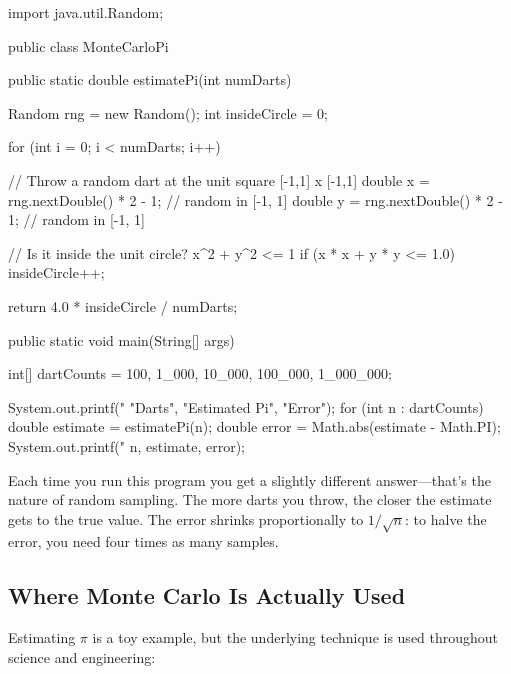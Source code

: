 \documentclass[11pt,letterpaper]{article}
\begin{document}
\begin{javacode}
import java.util.Random;

public class MonteCarloPi {

    public static double estimatePi(int numDarts) {
        Random rng = new Random();
        int insideCircle = 0;

        for (int i = 0; i < numDarts; i++) {
            // Throw a random dart at the unit square [-1,1] x [-1,1]
            double x = rng.nextDouble() * 2 - 1;   // random in [-1, 1]
            double y = rng.nextDouble() * 2 - 1;   // random in [-1, 1]

            // Is it inside the unit circle? x^2 + y^2 <= 1
            if (x * x + y * y <= 1.0) {
                insideCircle++;
            }
        }

        return 4.0 * insideCircle / numDarts;
    }

    public static void main(String[] args) {
        int[] dartCounts = {100, 1_000, 10_000, 100_000, 1_000_000};

        System.out.printf("%
                          "Darts", "Estimated Pi", "Error");
        for (int n : dartCounts) {
            double estimate = estimatePi(n);
            double error = Math.abs(estimate - Math.PI);
            System.out.printf("%
                              n, estimate, error);
        }
    }
}
\end{javacode}

Each time you run this program you get a slightly different answer---that's the nature of random sampling. The more darts you throw, the closer the estimate gets to the true value. The error shrinks proportionally to $1/\sqrt{n}$: to halve the error, you need four times as many samples.

\subsection{Where Monte Carlo Is Actually Used}

Estimating $\pi$ is a toy example, but the underlying technique is used throughout science and engineering:
\end{document}
